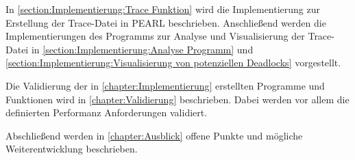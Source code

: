In \cref{section:Implementierung:Trace Funktion} wird die Implementierung zur
Erstellung der Trace-Datei in PEARL beschrieben. Anschließend werden die
Implementierungen des Programms zur Analyse und Visualisierung der Trace-Datei
in \cref{section:Implementierung:Analyse Programm} und
\cref{section:Implementierung:Visualisierung von potenziellen Deadlocks}
vorgestellt.

Die Validierung der in \cref{chapter:Implementierung} erstellten Programme und
Funktionen wird in \cref{chapter:Validierung} beschrieben. Dabei werden vor
allem die definierten Performanz Anforderungen validiert.

Abschließend werden in \cref{chapter:Ausblick} offene Punkte und mögliche
Weiterentwicklung beschrieben.